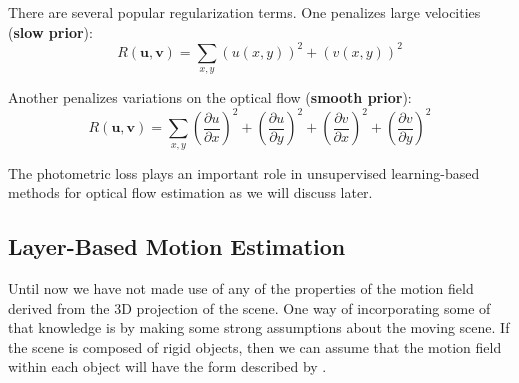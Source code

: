 There are several popular regularization terms. One penalizes large velocities ({\bf slow prior}): 
\begin{equation}
R(\mathbf{u}, \mathbf{v}) = 
\sum_{x,y} \left( u(x,y) \right)^2 +
\left( v(x,y)  \right)^2
\end{equation}

Another penalizes variations on the optical flow ({\bf smooth prior}):
\begin{equation}
R(\mathbf{u}, \mathbf{v}) = 
\sum_{x,y} \left( \frac{\partial u}{\partial x}  \right)^2 + \left( \frac{\partial u}{\partial y}  \right)^2 +
\left( \frac{\partial v}{\partial x}  \right)^2 + \left( \frac{\partial v}{\partial y}  \right)^2
\end{equation}

The photometric loss plays an important role in unsupervised learning-based methods for optical flow estimation as we will discuss later. 









\subsection{Layer-Based Motion Estimation}

Until now we have not made use of any of the properties of the motion field derived from the 3D projection of the scene. One way of incorporating some of that knowledge is by making some strong assumptions about the moving scene. If the scene is composed of rigid objects, then we can assume that the motion field within each object will have the form described by \eqn{\ref{eq:2d_motion_field_from_translation_and_rotation}}. 

